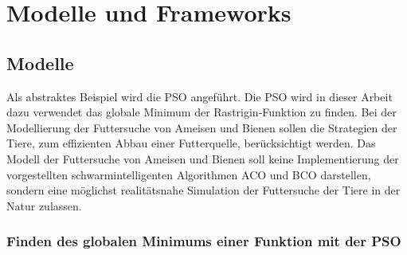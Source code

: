 \documentclass[a4paper, 11pt]{article}
\begin{document}
\section{Modelle und Frameworks}
\subsection{Modelle}
Als abstraktes Beispiel wird die \acs{PSO} angeführt. Die \acs{PSO} wird in dieser Arbeit dazu verwendet das globale Minimum der Rastrigin-Funktion zu finden. Bei der Modellierung der Futtersuche von Ameisen und Bienen sollen die Strategien der Tiere, zum effizienten Abbau einer Futterquelle, berücksichtigt werden. Das Modell der Futtersuche von Ameisen und Bienen soll keine Implementierung der vorgestellten schwarmintelligenten Algorithmen \acs{ACO} und \acs{BCO} darstellen, sondern eine möglichst realitätsnahe Simulation der Futtersuche der Tiere in der Natur zulassen. 
\subsubsection{Finden des globalen Minimums einer Funktion mit der \acs{PSO}}
\end{document}
